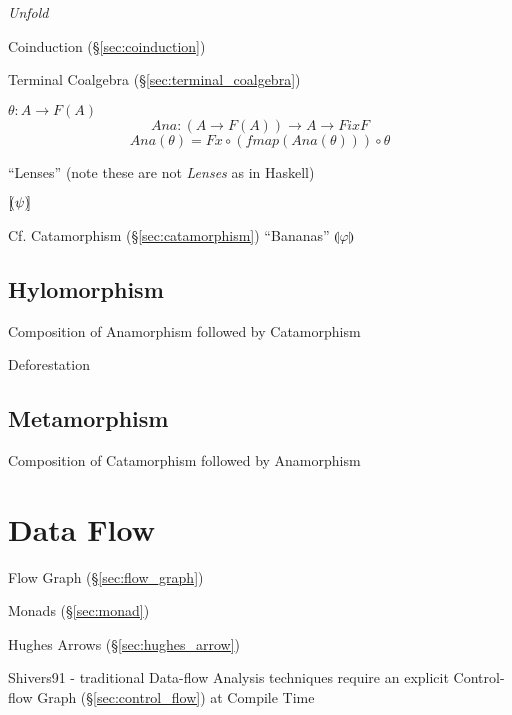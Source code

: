 \emph{Unfold}

Coinduction (\S\ref{sec:coinduction})

Terminal Coalgebra (\S\ref{sec:terminal_coalgebra})

$\theta : A \rightarrow F(A)$
\[
  Ana : (A \rightarrow F (A)) \rightarrow A \rightarrow Fix F
\]\[
  Ana (\theta) = Fx \circ (fmap (Ana (\theta))) \circ \theta
\]

``Lenses'' (note these are not \emph{Lenses} as in Haskell)

$[\kern-1.95pt( \psi )\kern-2.0pt]$

\fist Cf. Catamorphism (\S\ref{sec:catamorphism}) ``Bananas''
$\llparenthesis \varphi \rrparenthesis$



\subsection{Hylomorphism}\label{sec:hylomorphism}

Composition of Anamorphism followed by Catamorphism

Deforestation



\subsection{Metamorphism}\label{sec:metamorphism}

Composition of Catamorphism followed by Anamorphism



\section{Data Flow}\label{sec:data_flow}

\fist Flow Graph (\S\ref{sec:flow_graph})

Monads (\S\ref{sec:monad})

Hughes Arrows (\S\ref{sec:hughes_arrow})

Shivers91 - traditional Data-flow Analysis techniques require an
explicit Control-flow Graph (\S\ref{sec:control_flow}) at Compile Time

